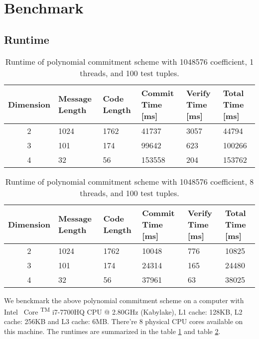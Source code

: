 \section{Benchmark}

\subsection{Runtime}


\begin{table}[h!]
\centering
\begin{tabular}{| c | m{4em}  | m{3em}  | m{3.5em} | m{2.5em} | m{3em} |} 
 \hline
 Dimension & Message Length & Code Length & Commit Time [ms] & Verify Time [ms] & Total Time [ms] \\ [0.5ex] 
 \hline\hline
 2 & 1024   & 1762 & 41737  & 3057  & 44794   \\
 \hline
 3 & 101    & 174 & 99642  & 623  & 100266  \\
 \hline
 4 & 32     & 56 & 153558  & 204  & 153762   \\
 \hline
\end{tabular}
\caption{Runtime of polynomial commitment scheme with 1048576 coefficient, 1 threads, and 100 test tuples.}
\label{table:benchmark-pc-1}
\end{table}

\begin{table}[h!]
\centering
\begin{tabular}{| c | m{4em}  | m{3em}  | m{3.5em} | m{2.5em} | m{3em} |} 
 \hline
 Dimension & Message Length & Code Length & Commit Time [ms] & Verify Time [ms] & Total Time [ms] \\ [0.5ex] 
 \hline\hline
 2 & 1024   & 1762 & 10048 & 776 & 10825  \\
 \hline
 3 & 101    & 174 & 24314 & 165 & 24480 \\
 \hline
 4 & 32     & 56 & 37961 & 63 & 38025  \\ 
 \hline
\end{tabular}
\caption{Runtime of polynomial commitment scheme with 1048576 coefficient, 8 threads, and 100 test tuples.}
\label{table:benchmark-pc-2}
\end{table}

We benckmark the above polynomial commitment scheme on a computer with
Intel \textregistered \, Core  \textsuperscript{TM} i7-7700HQ CPU @ 2.80GHz (Kabylake), L1 cache: 128KB, L2 cache: 256KB and L3 cache: 6MB. There're 8 physical CPU cores available on this machine. The runtimes are summarized in the table \ref{table:benchmark-pc-1} and table \ref{table:benchmark-pc-2}.


